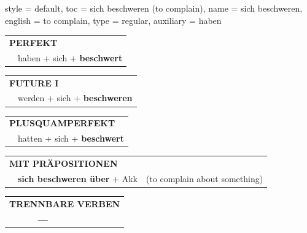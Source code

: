 \begin{verbentry}{
  style = {default},
  toc = {sich beschweren (to complain)},
  name = {sich beschweren},
  english = {to complain},
  type = {regular},
  auxiliary = {haben}
}
 \begin{tabular}{rl}
     \multicolumn{2}{l}{\textbf{PERFEKT}}\\
    &haben + sich + \textbf{beschwert}\\
  \end{tabular}
\hfill
   \begin{tabular}{rl}
   
    \multicolumn{2}{l}{\textbf{FUTURE I} }\\
    &werden + sich + \textbf{beschweren}\\
 
  \end{tabular}
\hfill
   \begin{tabular}{rl}
      \multicolumn{2}{l}{\textbf{PLUSQUAMPERFEKT}}\\
    &hatten + sich + \textbf{beschwert}\\
  \end{tabular}
  
\vspace{10pt}

   \begin{tabular}{lll}
      \multicolumn{3}{l}{\textbf{MIT PRÄPOSITIONEN}}\\
& \textbf{sich beschweren über} + Akk & (to complain about something)
  \end{tabular}
  \hfill
   \begin{tabular}{lll}
\multicolumn{3}{l}{\textbf{TRENNBARE VERBEN}}\\
& \textbf{---} & \\
\end{tabular}
  
  \vspace{-5pt}
\end{verbentry}

